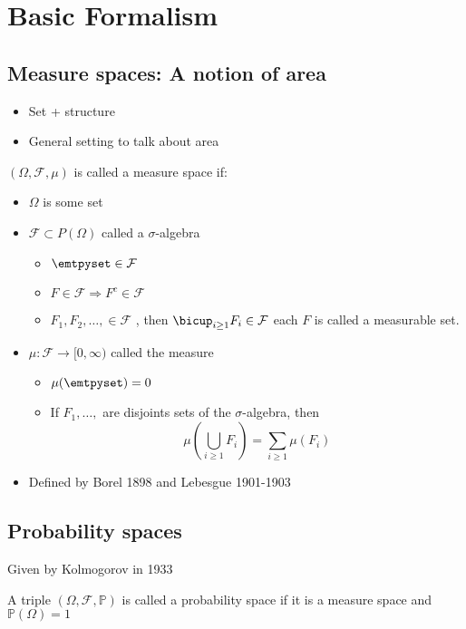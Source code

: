 \documentclass[../main.tex]{subfiles}
\begin{document}
\section{Basic Formalism}
\subsection{Measure spaces: A notion of area}
\begin{itemize}
\item Set + structure
\item General setting to talk about area
\end{itemize}
\begin{defn}
	$ ( \Omega, \mathcal{F}, \mu) $ is called a measure space if:
	\begin{itemize}
	\item $\Omega$ is some set
	\item $ \mathcal{F} \subset P( \Omega) $ called a $\sigma$-algebra
		\begin{itemize}
		\item $\emtpyset \in \mathcal{F}$ 
		\item $F \in \mathcal{F} \Rightarrow F^{c}\in \mathcal{F}$ 
		\item $F_1,F_2, \ldots, \in \mathcal{F}$ , then $\bicup_{i \geq 1} F_i \in \mathcal{F}$ each $F$ is called a measurable set.	
		\end{itemize}
	
	\item $\mu: \mathcal{F}\to [ 0, \infty ) $ called the measure
		\begin{itemize}
			\item $\mu( \emtpyset) =0$ 
			\item If $F_1, \ldots, $ are disjoints sets of the $\sigma$-algebra, then
				\[ 
					\mu( \bigcup_{i\geq 1} F_i) = \sum_{i \geq 1} \mu( F_i) 
				\]
				
		\end{itemize}

	\item Defined by Borel 1898 and Lebesgue 1901-1903
			
	\end{itemize}

	
\end{defn}
\subsection{Probability spaces}
Given by Kolmogorov in 1933
\begin{defn}
	A triple $( \Omega, \mathcal{F}, \mathbb{P}) $ is called a probability space if it is a measure space and $\mathbb{P}( \Omega) =1$ 
\end{defn}
\end{document}
